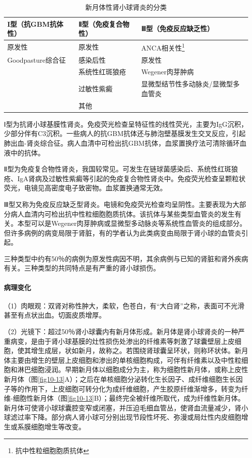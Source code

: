 \begin{longtable}[ht]{lll}
    \caption{新月体性肾小球肾炎的分类}
    \label{tab10-1}\\
    \toprule
    I型（抗GBM抗体性）&Ⅱ型（免疫复合物性）&Ⅲ型（免疫反应缺乏性）\\
    \midrule
    \endhead
    原发性&原发性&ANCA相关性\footnote{抗中性粒细胞胞质抗体}\\
Goodpasture综合征&感染后性&原发性\\
&系统性红斑狼疮&Wegener肉芽肿病\\
&过敏性紫癜&显微型结节性多动脉炎/显微型多血管炎\\
&其他&\\
    \bottomrule
\end{longtable}

Ⅰ型为抗肾小球基膜性肾炎。免疫荧光检查呈特征性的线性荧光，主要为IgG沉积，少部分伴有C3沉积。一些病人的抗GBM抗体还与肺泡壁基膜发生交叉反应，引起肺出血-肾炎综合征。病人血清中可检出抗GBM抗体，血浆置换疗法可清除循环血液中的抗体。

Ⅱ型为免疫复合物性肾炎，我国较常见。可发生在链球菌感染后、系统性红斑狼疮、IgA肾病及过敏性紫癜等引起的免疫复合物性肾炎中。免疫荧光检查呈颗粒状荧光，电镜见高密度电子致密物。血浆置换通常无效。

Ⅲ型又称为免疫反应缺乏型肾炎。电镜和免疫荧光检查均呈阴性。主要表现为大部分病人血清内可检出抗中性粒细胞胞质抗体。该抗体与某些类型血管炎的发生有关。本型可以是Wegener肉芽肿病或显微型多动脉炎等系统性血管炎的组成部分。但许多病例的病变局限于肾脏，有的学者认为此类病变由局限于肾小球的血管炎引起。

三种类型中约有50％的病例为原发性病因不明，其余病例与已知的肾脏和肾外疾病有关。三种类型的共同特点是有严重的肾小球损伤。

\paragraph{病理变化}
（1）肉眼观：双肾对称性肿大，柔软，色苍白，有“大白肾”之称，表面可不光滑甚至有点状出血。切面皮质增厚。

（2）光镜下：超过50％肾小球囊内有新月体形成。新月体是肾小球肾炎的一种严重病变，是由于肾小球基膜的灶性损伤处渗出的纤维素等刺激了球囊壁层上皮细胞，使其增生成层，状如新月，故称之。若围绕肾球囊呈环状，则称环状体。新月体主要由增生的壁层上皮细胞和渗出的单核细胞构成，可伴有纤维素以及中性粒细胞和淋巴细胞浸润。早期新月体以细胞成分为主，称为细胞性新月体，或称上皮性新月体（图\ref{fig10-13}A）；之后在单核细胞分泌转化生长因子、成纤维细胞生长因子等的作用下，上皮细胞可转分化为成纤维细胞，产生胶原纤维渐增多，转变为纤维-细胞性新月体（图\ref{fig10-13}B）；最终完全被纤维所取代，成为纤维性新月体。新月体可使肾小球球囊腔变窄或闭塞，并压迫毛细血管丛，使肾血流量减少，肾小球滤过率下降。部分病人肾小球可分别出现节段性坏死、弥漫或局灶性内皮细胞增生或系膜细胞增生等改变。

